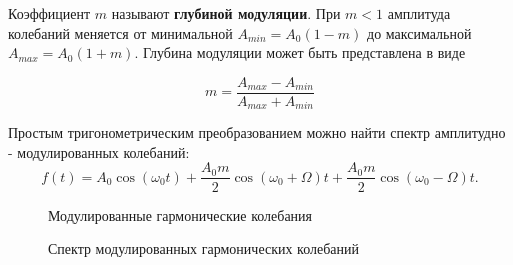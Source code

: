 \documentclass[a4paper,12pt]{article}
\begin{document}
Коэффициент $m$ называют \textbf{глубиной модуляции}. При $m<1$ амплитуда колебаний меняется от минимальной $A_{min}=A_{0}(1-m)$ до максимальной $A_{max}=A_{0}(1+m).$ Глубина модуляции может быть представлена в виде

\begin{equation}\label{eq:8}
	 m=\dfrac{A_{max}-A_{min}}{A_{max}+A_{min}}
\end{equation}

Простым тригонометрическим преобразованием можно найти спектр амплитудно - модулированных колебаний: \\

\begin{equation}\label{a}
	f(t)=A_{0}\cos(\omega_{0} t)+\dfrac{A_{0}m}{2}\cos(\omega_{0}+\Omega)t+\dfrac{A_{0}m}{2}\cos(\omega_{0}-\Omega)t.
\end{equation}


\begin{figure}[h]
    \begin{minipage}[h]{0.5\linewidth}
        \caption{Модулированные гармонические колебания}
        \label{pic:5}
    \end{minipage}
    \begin{minipage}[h]{0.5\linewidth}
        \caption{Спектр модулированных гармонических колебаний}
        \label{pic:6}
    \end{minipage}
\end{figure}
\end{document}
